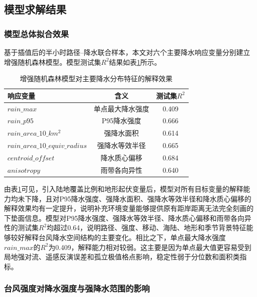 \documentclass[UTF8,a4paper,zihao=5,fontset=fandol]{ctexart}
\numberwithin{equation}{section}
\numberwithin{figure}{section}
\numberwithin{table}{section}
\begin{document}
\subsection{模型求解结果}

\subsubsection{模型总体拟合效果}

基于插值后的半小时路径--降水联合样本，本文对六个主要降水响应变量分别建立增强随机森林模型。模型测试集$R^2$结果如表\ref{tab:rf_r2_problem1}所示。

\begin{table}[htbp]
    \centering
    \caption{增强随机森林模型对主要降水分布特征的解释效果}
    \label{tab:rf_r2_problem1}
    \begin{tabular}{lcc}
        \hline
        响应变量 & 含义 & 测试集$R^2$ \\
        \hline
        $rain\_max$ & 单点最大降水强度 & 0.409 \\
        $rain\_p95$ & P95降水强度 & 0.666 \\
        $rain\_area\_10\_km^2$ & 强降水面积 & 0.614 \\
        $rain\_area\_10\_equiv\_radius$ & 强降水等效半径 & 0.665 \\
        $centroid\_offset$ & 降水质心偏移 & 0.684 \\
        $anisotropy$ & 雨带各向异性 & 0.640 \\
        \hline
    \end{tabular}
\end{table}

由表\ref{tab:rf_r2_problem1}可见，引入陆地覆盖比例和地形起伏变量后，模型对所有目标变量的解释能力均未下降，且对P95降水强度、强降水面积、强降水等效半径和降水质心偏移的解释效果均有一定提升，说明补充环境变量能够提供原有距岸距离无法完全刻画的下垫面信息。模型对P95降水强度、强降水等效半径、降水质心偏移和雨带各向异性的测试集$R^2$均超过0.64，说明路径、强度、移动、海陆、地形和季节背景特征能够较好解释台风降水空间结构的主要变化。相比之下，单点最大降水强度$rain\_max$的$R^2$为0.409，解释能力相对较弱。这主要是因为单点最大值更容易受到局地强对流、遥感反演误差和孤立极值格点影响，稳定性弱于分位数和面积类指标。

\subsubsection{台风强度对降水强度与强降水范围的影响}
\end{document}
